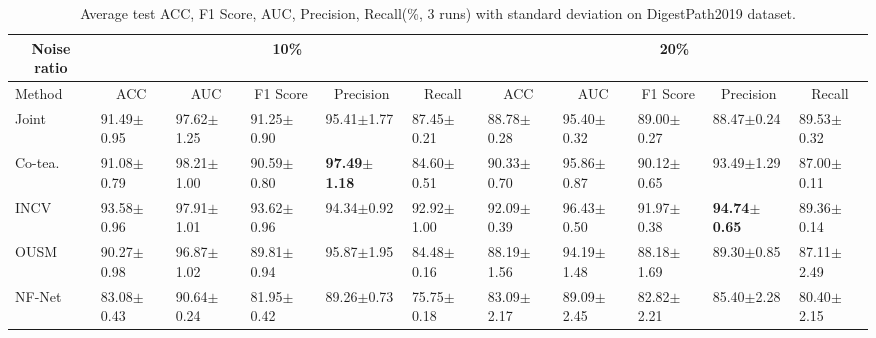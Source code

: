 \begin{table*}[]
\scriptsize
\centering
\caption{{Average test ACC, F1 Score, AUC, {Precision}, Recall(\%, 3 runs) with standard deviation on DigestPath2019 dataset.}}
\label{table:objMiccai}
\begin{tabular}{@{}lllllllllll@{}}
\toprule
\multicolumn{1}{c}{Noise ratio} & \multicolumn{5}{c}{10\%}                                                                                                                & \multicolumn{5}{c}{20\%}                                                                                                                \\ \midrule
Method                & \multicolumn{1}{c}{ACC} & \multicolumn{1}{c}{AUC} & \multicolumn{1}{c}{F1 Score} & \multicolumn{1}{c}{{Precision}} & \multicolumn{1}{c}{Recall} & \multicolumn{1}{c}{ACC} & \multicolumn{1}{c}{AUC} & \multicolumn{1}{c}{F1 Score} & \multicolumn{1}{c}{{Precision}} & \multicolumn{1}{c}{Recall} \\ \midrule
Joint                     & 91.49$\pm$0.95          & 97.62$\pm$1.25          & 91.25$\pm$0.90               & 95.41$\pm$1.77          & 87.45$\pm$0.21             & 88.78$\pm$0.28          & 95.40$\pm$0.32          & 89.00$\pm$0.27               & 88.47$\pm$0.24          & 89.53$\pm$0.32             \\
Co-tea.                     & 91.08$\pm$0.79          & 98.21$\pm$1.00          & 90.59$\pm$0.80               & \textbf{97.49$\pm$1.18} & 84.60$\pm$0.51             & 90.33$\pm$0.70          & 95.86$\pm$0.87          & 90.12$\pm$0.65               & 93.49$\pm$1.29          & 87.00$\pm$0.11             \\
INCV                            & 93.58$\pm$0.96          & 97.91$\pm$1.01          & 93.62$\pm$0.96               & 94.34$\pm$0.92          & 92.92$\pm$1.00             & 92.09$\pm$0.39          & 96.43$\pm$0.50          & 91.97$\pm$0.38               & \textbf{94.74$\pm$0.65} & 89.36$\pm$0.14             \\
OUSM                       & 90.27$\pm$0.98          & 96.87$\pm$1.02          & 89.81$\pm$0.94               & 95.87$\pm$1.95          & 84.48$\pm$0.16             & 88.19$\pm$1.56          & 94.19$\pm$1.48          & 88.18$\pm$1.69               & 89.30$\pm$0.85          & 87.11$\pm$2.49             \\
NF-Net                          & 83.08$\pm$0.43          & 90.64$\pm$0.24          & 81.95$\pm$0.42               & 89.26$\pm$0.73          & 75.75$\pm$0.18             & 83.09$\pm$2.17          & 89.09$\pm$2.45          & 82.82$\pm$2.21               & 85.40$\pm$2.28          & 80.40$\pm$2.15             \\

\end{tabular}
\end{table*}
